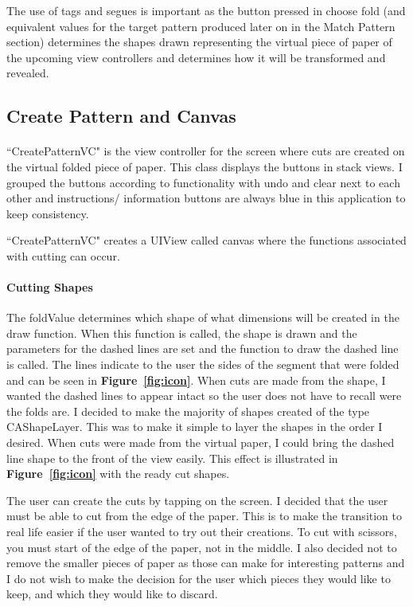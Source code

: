 \documentclass[11pt]{article}
\begin{document}
            The use of tags and segues is important as the button pressed in choose fold (and equivalent values for the target pattern produced later on in the Match Pattern section) determines the shapes drawn representing the virtual piece of paper of the upcoming view controllers and determines how it will be transformed and revealed.
            
                
            \subsection{Create Pattern and Canvas}
                \paragraph{}
                ``CreatePatternVC" is the view controller for the screen where cuts are created on the virtual folded piece of paper. This class displays the buttons in stack views. I grouped the buttons according to functionality with undo and clear next to each other and instructions/ information buttons are always blue in this application to keep consistency. 
                
                ``CreatePatternVC" creates a UIView called canvas where the functions associated with cutting can occur.
                    
                 \paragraph{Cutting Shapes}
                 The foldValue determines which shape of what dimensions will be created in the draw function. When this function is called, the shape is drawn and the parameters for the dashed lines are set and the function to draw the dashed line is called. The lines indicate to the user the sides of the segment that were folded and can be seen in \textbf{Figure~\ref{fig:icon}}.
                 When cuts are made from the shape, I wanted the dashed lines to appear intact so the user does not have to recall were the folds are. I decided to make the majority of shapes created of the type CAShapeLayer. This was to make it simple to layer the shapes in the order I desired. When cuts were made from the virtual paper, I could bring the dashed line shape to the front of the view easily. This effect is illustrated in \textbf{Figure~\ref{fig:icon}} with the ready cut shapes.
                 
                 The user can create the cuts by tapping on the screen. I decided that the user must be able to cut from the edge of the paper. This is to make the transition to real life easier if the user wanted to try out their creations. To cut with scissors, you must start of the edge of the paper, not in the middle. I also decided not to remove the smaller pieces of paper as those can make for interesting patterns and I do not wish to make the decision for the user which pieces they would like to keep, and which they would like to discard.
                 
\end{document}
